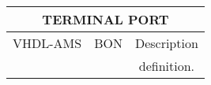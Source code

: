 \begin{center}
\begin{tabular}{ c  c  c }
\multicolumn{3}{c}{\textbf{TERMINAL PORT}}\\ 
\hline \hline
VHDL-AMS & BON & Description \\ 
\hline \hline

\begin{minipage}[c]{2.4cm} 
\centering
\smallskip \smallskip 

\smallskip \smallskip
\end{minipage}  
&
\begin{minipage}[c]{4.6cm}
\centering 
\smallskip \smallskip

\smallskip \smallskip
\end{minipage}  
& 
\begin{minipage}[c]{6cm}  
\smallskip \smallskip
definition.
\smallskip \smallskip
\end{minipage}\\ 
\end{tabular}
\end{center}
